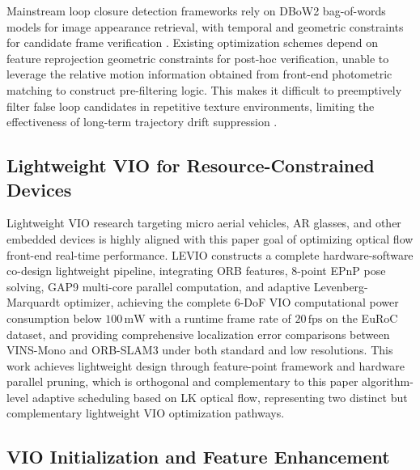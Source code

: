 \documentclass[journal,twoside,web]{ieeecolor}
\begin{document}
Mainstream loop closure detection frameworks rely on DBoW2 bag-of-words models for image appearance retrieval, with temporal and geometric constraints for candidate frame verification \cite{galvez2012bags,mur2015orb,campos2021orb}. Existing optimization schemes depend on feature reprojection geometric constraints for post-hoc verification, unable to leverage the relative motion information obtained from front-end photometric matching to construct pre-filtering logic. This makes it difficult to preemptively filter false loop candidates in repetitive texture environments, limiting the effectiveness of long-term trajectory drift suppression \cite{cadena2010past}.

\subsection{Lightweight VIO for Resource-Constrained Devices}

Lightweight VIO research targeting micro aerial vehicles, AR glasses, and other embedded devices is highly aligned with this paper goal of optimizing optical flow front-end real-time performance. LEVIO \cite{kuhne2026levio} constructs a complete hardware-software co-design lightweight pipeline, integrating ORB features, 8-point EPnP pose solving, GAP9 multi-core parallel computation, and adaptive Levenberg-Marquardt optimizer, achieving the complete 6-DoF VIO computational power consumption below $100\,\mathrm{mW}$ with a runtime frame rate of $20\,\mathrm{fps}$ on the EuRoC dataset, and providing comprehensive localization error comparisons between VINS-Mono and ORB-SLAM3 under both standard and low resolutions. This work achieves lightweight design through feature-point framework and hardware parallel pruning, which is orthogonal and complementary to this paper algorithm-level adaptive scheduling based on LK optical flow, representing two distinct but complementary lightweight VIO optimization pathways.

\subsection{VIO Initialization and Feature Enhancement}
\end{document}
